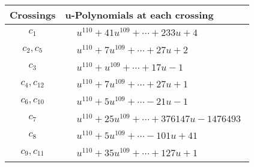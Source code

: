 \documentclass[1p]{elsarticle_modified}
\theoremstyle{definition}
\begin{document}
\begin{tabular}{m{50pt}|m{274pt}}
Crossings & \hspace{64pt}u-Polynomials at each crossing \\
\hline $$\begin{aligned}c_{1}\end{aligned}$$&$\begin{aligned}
&u^{110}+41 u^{109}+\cdots+233 u+4
\end{aligned}$\\
\hline $$\begin{aligned}c_{2},c_{5}\end{aligned}$$&$\begin{aligned}
&u^{110}+7 u^{109}+\cdots+27 u+2
\end{aligned}$\\
\hline $$\begin{aligned}c_{3}\end{aligned}$$&$\begin{aligned}
&u^{110}+u^{109}+\cdots+17 u-1
\end{aligned}$\\
\hline $$\begin{aligned}c_{4},c_{12}\end{aligned}$$&$\begin{aligned}
&u^{110}+7 u^{109}+\cdots+27 u+1
\end{aligned}$\\
\hline $$\begin{aligned}c_{6},c_{10}\end{aligned}$$&$\begin{aligned}
&u^{110}+5 u^{109}+\cdots-21 u-1
\end{aligned}$\\
\hline $$\begin{aligned}c_{7}\end{aligned}$$&$\begin{aligned}
&u^{110}+25 u^{109}+\cdots+376147 u-1476493
\end{aligned}$\\
\hline $$\begin{aligned}c_{8}\end{aligned}$$&$\begin{aligned}
&u^{110}+5 u^{109}+\cdots-101 u+41
\end{aligned}$\\
\hline $$\begin{aligned}c_{9},c_{11}\end{aligned}$$&$\begin{aligned}
&u^{110}+35 u^{109}+\cdots+127 u+1
\end{aligned}$\\
\hline
\end{tabular}\\~\\
\end{document}
